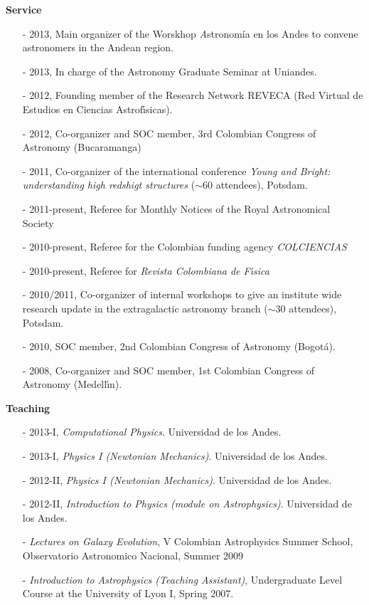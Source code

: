 \documentclass[9pt]{article}
\begin{document}
{\bf Service}
\begin{itemize}
\item[-] 2013, Main organizer of the Worskhop {\textit Astronom\'ia en los Andes} to convene astronomers in the Andean region.
\item[-] 2013, In charge of the Astronomy Graduate Seminar at Uniandes.
\item[-] 2012, Founding member of the Research Network REVECA (Red Virtual de Estudios en Ciencias Astrof\'{\i}sicas).
\item[-] 2012, Co-organizer and SOC member, 3rd Colombian Congress of Astronomy (Bucaramanga)
\item[-] 2011, Co-organizer of the international conference {\it Young and Bright: understanding high redshigt structures} ($\sim 60$ attendees), Potsdam.
\item[-] 2011-present, Referee for Monthly Notices of the Royal Astronomical Society %
\item[-] 2010-present, Referee for the Colombian funding agency {\it COLCIENCIAS} %
\item[-] 2010-present, Referee for {\it Revista Colombiana de F\'{\i}sica} %
\item[-] 2010/2011, Co-organizer of internal workshops to give an institute wide research update in the extragalactic astronomy branch ($\sim 30$ attendees), Potsdam.
\item[-] 2010, SOC member, 2nd Colombian Congress of Astronomy (Bogot\'a).
\item[-] 2008, Co-organizer and SOC member, 1st Colombian Congress of Astronomy (Medell\'{\i}n).
\end{itemize}

{\bf Teaching}
\begin{itemize}
\item[-] 2013-I, {\it Computational Physics}. Universidad de los Andes.
\item[-] 2013-I, {\it Physics I (Newtonian Mechanics)}. Universidad de los Andes.
\item[-] 2012-II, {\it Physics I (Newtonian Mechanics)}. Universidad de los Andes.
\item[-] 2012-II, {\it Introduction to Physics (module on Astrophysics)}. Universidad de los Andes.
\item[-]{\it Lectures on Galaxy Evolution}, V Colombian
  Astrophysics Summer School, Observatorio Astronomico Nacional, Summer 2009
\item[-]{\it{Introduction to Astrophysics (Teaching
      Assistant)}}, Undergraduate Level Course at the University of Lyon I,
      Spring 2007.
\end{itemize}
\end{document}
